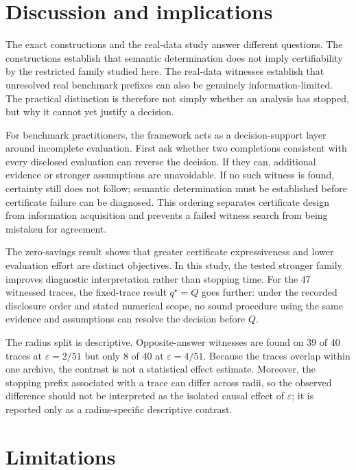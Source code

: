 \documentclass[preprint,11pt]{elsarticle}
\begin{document}
\section{Discussion and implications}

The exact constructions and the real-data study answer different questions. The constructions establish that semantic determination does not imply certifiability by the restricted family studied here. The real-data witnesses establish that unresolved real benchmark prefixes can also be genuinely information-limited. The practical distinction is therefore not simply whether an analysis has stopped, but why it cannot yet justify a decision.

For benchmark practitioners, the framework acts as a decision-support layer around incomplete evaluation. First ask whether two completions consistent with every disclosed evaluation can reverse the decision. If they can, additional evidence or stronger assumptions are unavoidable. If no such witness is found, certainty still does not follow; semantic determination must be established before certificate failure can be diagnosed. This ordering separates certificate design from information acquisition and prevents a failed witness search from being mistaken for agreement.

The zero-savings result shows that greater certificate expressiveness and lower evaluation effort are distinct objectives. In this study, the tested stronger family improves diagnostic interpretation rather than stopping time. For the 47 witnessed traces, the fixed-trace result $q^\star=Q$ goes further: under the recorded disclosure order and stated numerical scope, no sound procedure using the same evidence and assumptions can resolve the decision before $Q$.

The radius split is descriptive. Opposite-answer witnesses are found on 39 of 40 traces at $\varepsilon=2/51$ but only 8 of 40 at $\varepsilon=4/51$. Because the traces overlap within one archive, the contrast is not a statistical effect estimate. Moreover, the stopping prefix associated with a trace can differ across radii, so the observed difference should not be interpreted as the isolated causal effect of $\varepsilon$; it is reported only as a radius-specific descriptive contrast.

\section{Limitations}
\end{document}
